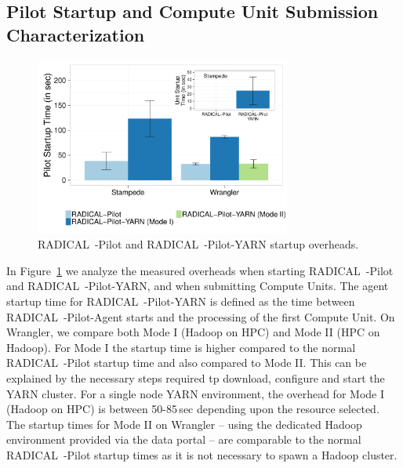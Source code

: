\subsection{Pilot Startup and Compute Unit Submission Characterization}
\label{ssec:startup_pilot_unit}

\begin{figure}[t]
    \centering
    \includegraphics[width=0.75\textwidth]{figures/data_analytics_hpc/hpc_hadoop/pilot_unit_startup.pdf}
    \caption{RADICAL~-Pilot and RADICAL~-Pilot-YARN startup overheads.
        \label{fig:startup_yarn}}
\end{figure}

In Figure~\ref{fig:startup_yarn} we analyze the measured overheads when starting RADICAL~-Pilot and RADICAL~-Pilot-YARN, and when submitting Compute Units.
The agent startup time for RADICAL~-Pilot-YARN is defined as the time between RADICAL~-Pilot-Agent starts and the processing of the first Compute Unit.
On Wrangler, we compare both Mode I (Hadoop on HPC) and Mode II (HPC on Hadoop).
For Mode I the startup time is higher compared to the normal RADICAL~-Pilot startup time and also compared to Mode II.
This can be explained by the necessary steps required tp download, configure and start the YARN cluster.
For a single node YARN environment, the overhead for Mode I (Hadoop on HPC) is between 50-85\,sec depending upon the resource selected.
The startup times for Mode II on Wrangler -- using the dedicated Hadoop environment provided via the data portal -- are comparable to the normal RADICAL~-Pilot startup times as it is not necessary to spawn a Hadoop cluster.

